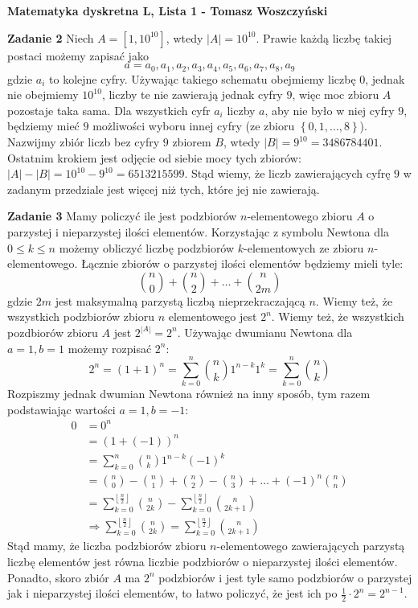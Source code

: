 \documentclass[a4paper,12pt]{article}
\newcommand{\floor}[1]{\left\lfloor #1 \right\rfloor}
\newcommand{\set}[1]{\left \{ #1 \right \}}
\begin{document}
\noindent \textbf{Matematyka dyskretna L, Lista 1 - Tomasz Woszczyński}\newline

\noindent \newline \textbf{Zadanie 2} \newline
Niech $A = \left[ 1, 10^{10} \right]$, wtedy $|A| = 10^{10}$. Prawie każdą liczbę takiej postaci możemy zapisać jako 
$$a = a_0, a_1, a_2, a_3, a_4, a_5, a_6, a_7, a_8, a_9 $$
gdzie $a_i$ to kolejne cyfry. Używając takiego schematu obejmiemy liczbę $0$, jednak nie obejmiemy $10^{10}$, liczby te nie zawierają jednak cyfry $9$, więc moc zbioru $A$ pozostaje taka sama. Dla wszystkich cyfr $a_i$ liczby $a$, aby nie było w niej cyfry $9$, będziemy mieć $9$ możliwości wyboru innej cyfry (ze zbioru $\set{0,1, \ldots, 8}$). Nazwijmy zbiór liczb bez cyfry $9$ zbiorem $B$, wtedy $|B| = 9^{10} = 3486784401$. Ostatnim krokiem jest odjęcie od siebie mocy tych zbiorów: $|A|-|B| = 10^{10} - 9^{10} = 6513215599$. Stąd wiemy, że liczb zawierających cyfrę $9$ w zadanym przedziale jest więcej niż tych, które jej nie zawierają.

\noindent \newline \textbf{Zadanie 3} \newline
Mamy policzyć ile jest podzbiorów $n$-elementowego zbioru $A$ o parzystej i nieparzystej ilości elementów. Korzystając z symbolu Newtona dla $0 \leq k \leq n$ możemy obliczyć liczbę podzbiorów $k$-elementowych ze zbioru $n$-elementowego. Łącznie zbiorów o parzystej ilości elementów będziemy mieli tyle:
$$\binom{n}{0} + \binom{n}{2} + \ldots + \binom{n}{2m}$$
gdzie $2m$ jest maksymalną parzystą liczbą nieprzekraczającą $n$. Wiemy też, że wszystkich podzbiorów zbioru $n$ elementowego jest $2^n$. Wiemy też, że wszystkich pozdbiorów zbioru $A$ jest $2^{|A|}=2^n$. Używając dwumianu Newtona dla $a=1, b=1$ możemy rozpisać $2^n$:
$$2^n = (1+1)^n  = \sum\limits_{k=0}^{n} \binom{n}{k} 1^{n-k}1^{k} = \sum\limits_{k=0}^{n} \binom{n}{k}$$
\noindent Rozpiszmy jednak dwumian Newtona również na inny sposób, tym razem podstawiając wartości $a=1, b=-1$:
$$
\begin{aligned}
0 	&= 0^n \\
 	&= (1 + (-1))^{n}	\\
	&= \sum\limits_{k=0}^{n} \binom{n}{k} 1^{n-k} (-1)^{k}	\\
	&= \binom{n}{0} - \binom{n}{1} + \binom{n}{2} - \binom{n}{3} + \ldots + (-1)^n \binom{n}{n}	\\
	&= \sum\limits_{k=0}^{\floor{\frac{n}{2}}} \binom{n}{2k} - \sum\limits_{k=0}^{\floor{\frac{n}{2}}} \binom{n}{2k+1} \\
	&\Rightarrow \sum\limits_{k=0}^{\floor{\frac{n}{2}}} \binom{n}{2k} = \sum\limits_{k=0}^{\floor{\frac{n}{2}}} \binom{n}{2k+1}
\end{aligned}
$$
Stąd mamy, że liczba podzbiorów zbioru $n$-elementowego zawierających parzystą liczbę elementów jest równa liczbie podzbiorów o nieparzystej ilości elementów. Ponadto, skoro zbiór $A$ ma $2^n$ podzbiorów i jest tyle samo podzbiorów o parzystej jak i nieparzystej ilości elementów, to łatwo policzyć, że jest ich po $\frac{1}{2}\cdot 2^n = 2^{n-1}$.
\end{document}
